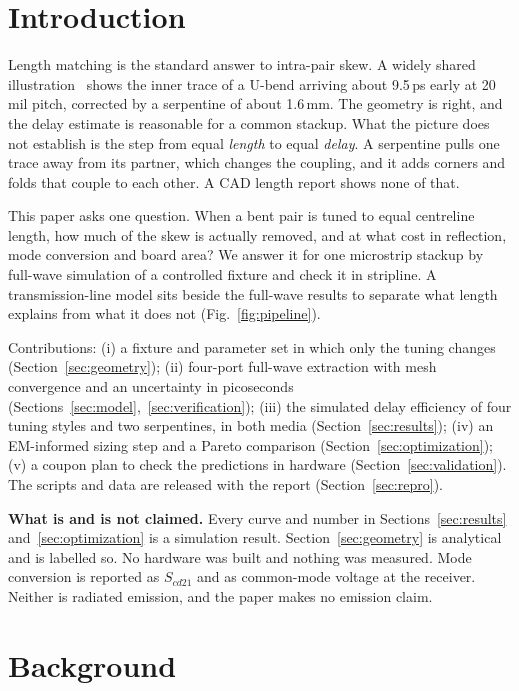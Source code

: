 \documentclass[10pt,twocolumn]{article}
\newcommand{\Scd}[1]{S_{cd#1}}
\begin{document}
\section{Introduction}

Length matching is the standard answer to intra-pair skew. A widely shared illustration~\cite{xpost} shows the
inner trace of a U-bend arriving about 9.5\,ps early at 20\,mil pitch, corrected by a serpentine of about
1.6\,mm. The geometry is right, and the delay estimate is reasonable for a common stackup. What the picture does
not establish is the step from equal \emph{length} to equal \emph{delay}. A serpentine pulls one trace away from
its partner, which changes the coupling, and it adds corners and folds that couple to each other. A CAD length
report shows none of that.

This paper asks one question. When a bent pair is tuned to equal centreline length, how much of the skew is
actually removed, and at what cost in reflection, mode conversion and board area? We answer it for one microstrip
stackup by full-wave simulation of a controlled fixture and check it in stripline. A transmission-line model sits
beside the full-wave results to separate what length explains from what it does not (Fig.~\ref{fig:pipeline}).

Contributions: (i) a fixture and parameter set in which only the tuning changes (Section~\ref{sec:geometry});
(ii) four-port full-wave extraction with mesh convergence and an uncertainty in picoseconds
(Sections~\ref{sec:model},~\ref{sec:verification}); (iii) the simulated delay efficiency of four tuning styles and
two serpentines, in both media (Section~\ref{sec:results}); (iv) an EM-informed sizing step and a Pareto comparison
(Section~\ref{sec:optimization}); (v) a coupon plan to check the predictions in hardware
(Section~\ref{sec:validation}). The scripts and data are released with the report (Section~\ref{sec:repro}).

\textbf{What is and is not claimed.} Every curve and number in Sections~\ref{sec:results}
and~\ref{sec:optimization} is a simulation result. Section~\ref{sec:geometry} is analytical and is labelled so.
No hardware was built and nothing was measured. Mode conversion is reported as $\Scd{21}$ and as common-mode
voltage at the receiver. Neither is radiated emission, and the paper makes no emission claim.

\section{Background}
\end{document}
